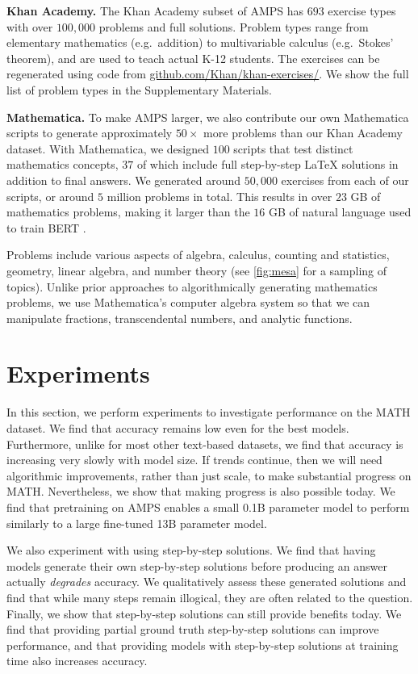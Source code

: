 \textbf{Khan Academy.}\quad
The Khan Academy subset of AMPS has $693$ exercise types with over $100,\!000$ problems and full solutions. Problem types range from elementary mathematics (e.g.~addition) to multivariable calculus (e.g.~Stokes' theorem), and are used to teach actual K-12 students. The exercises can be regenerated using code from 
\href{https://github.com/Khan/khan-exercises/}{github.com/Khan/khan-exercises/}. We show the full list of problem types in the Supplementary Materials. 

\textbf{Mathematica.}\quad
To make AMPS larger, we also contribute our own Mathematica scripts to generate approximately $50\times$ more problems than our Khan Academy dataset. With Mathematica, we designed $100$ scripts that test distinct mathematics concepts, $37$ of which include full step-by-step \LaTeX{} solutions in addition to final answers. We generated around $50,\!000$ exercises from each of our scripts, or around $5$ million problems in total. This results in over $23$ GB of mathematics problems, making it larger than the $16$ GB of natural language used to train BERT \citep{Devlin2019BERTPO}.

Problems include various aspects of algebra, calculus, counting and statistics, geometry, linear algebra, and number theory (see \ref{fig:mesa} for a sampling of topics). Unlike prior approaches to algorithmically generating mathematics problems, we use Mathematica's computer algebra system so that we can manipulate fractions, transcendental numbers, and analytic functions. 

\section{Experiments}

In this section, we perform experiments to investigate performance on the MATH dataset. We find that accuracy remains low even for the best models. Furthermore, unlike for most other text-based datasets, we find that accuracy is increasing very slowly with model size. If trends continue, then we will need algorithmic improvements, rather than just scale, to make substantial progress on MATH. Nevertheless, we show that making progress is also possible today. We find that pretraining on AMPS enables a small 0.1B parameter model to perform similarly to a large fine-tuned 13B parameter model. 

We also experiment with using step-by-step solutions. We find that having models generate their own step-by-step solutions before producing an answer actually \emph{degrades} accuracy. We qualitatively assess these generated solutions and find that while many steps remain illogical, they are often related to the question. Finally, we show that step-by-step solutions can still provide benefits today. We find that providing partial ground truth step-by-step solutions can improve performance, and that providing models with step-by-step solutions at training time also increases accuracy.

